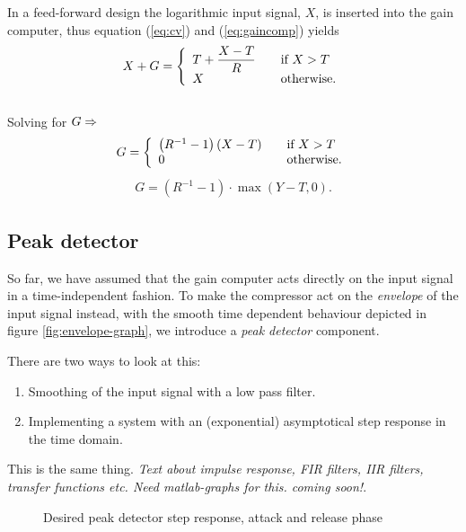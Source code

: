 \documentclass[]{article}
\begin{document}
In a feed-forward design the logarithmic input signal, $X$,  is inserted into the gain computer, thus equation (\ref{eq:cv}) and (\ref{eq:gaincomp}) yields
\begin{equation}
X+G = \left\{ 
  \begin{array}{l l}
    T+ \dfrac{X-T}{R} & \quad \text{if $X > T$}\\
    X & \quad \text{otherwise.}
  \end{array} \right.
\end{equation}
\\Solving for $G \rm \Rightarrow$
\begin{equation} \label{eq:c}
G = \left\{ 
  \begin{array}{l l}
    \left(R^{-1}-1\right)(X-T)& \quad \text{if $X > T$}\\
    0 & \quad \text{otherwise.}
  \end{array} \right.
\end{equation}
\begin{align}
G = (R^{-1}-1)\cdot \max\left(Y-T,0\right).
\end{align}

\subsection{Peak detector}
So far, we have assumed that the gain computer acts directly on the input signal in a time-independent fashion. To make the compressor act on the \emph{envelope} of the input signal instead, with the smooth time dependent behaviour depicted in figure \ref{fig:envelope-graph}, we introduce a \emph{peak detector} component.

There are two ways to look at this:
\begin{enumerate}
\item Smoothing of the input signal with a low pass filter.
\item Implementing a system with an (exponential) asymptotical step response in the time domain.
\end{enumerate}

This is the same thing. \emph{Text about impulse response, FIR filters, IIR filters, transfer functions etc. Need matlab-graphs for this. coming soon!}.

\begin{figure}[ht]
\centering

\caption{Desired peak detector step response, attack and release phase} 
\label{fig:attack-release-graph}
\end{figure}
\end{document}
